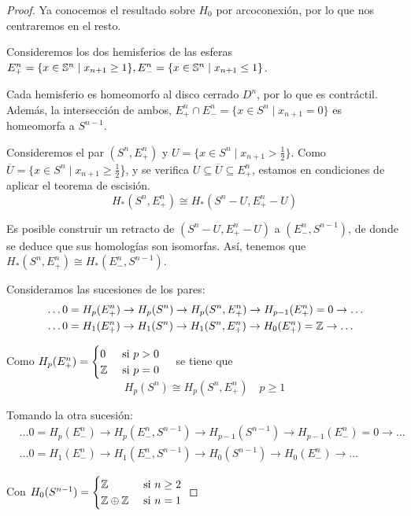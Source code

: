 \begin{proof}
  Ya conocemos el resultado sobre $H_0$ por arcoconexión, por lo que nos centraremos en el resto.

  Consideremos los dos hemisferios de las esferas \\
  $E_+^n = \{x \in \S^n \mid x_{n+1} \geq 1\}, E_-^n = \{x \in \S^n \mid x_{n+1} \leq 1\}$.

  Cada hemisferio es homeomorfo al disco cerrado $D^n$, por lo que es contráctil. Además, la intersección de
  ambos, $E_+^n \cap E_-^n = \{x \in S^n \mid x_{n+1} = 0\}$ es homeomorfa a $S^{n-1}$.

  Consideremos el par $(S^n, E_+^n)$ y $U = \{x \in S^n \mid x_{n+1} > \frac{1}{2}\}$. Como
  $\overline{U} = \{x \in S^n \mid x_{n+1} \geq \frac{1}{2}$\}, y se verifica $U \subseteq \overline{U} \subseteq E_+^n$,
  estamos en condiciones de aplicar el teorema de escisión.
  \[ H_*(S^n, E_+^n) \cong H_*(S^n - U, E_+^n - U) \]

  Es posible construir un retracto de $(S^n - U, E_+^n - U)$ a $(E_-^n, S^{n-1})$, de donde se deduce que sus
  homologías son isomorfas. Así, tenemos que $H_*(S^n, E_+^n) \cong H_*(E_-^n, S^{n-1})$.

  Consideramos las sucesiones de los pares:
  \begin{align*}
    &\dots 0 = H_p(E_+^n) \to H_p(S^n) \to H_p(S^n, E_+^n) \to H_{p-1}(E_+^n) = 0 \to \dots \\
    &\dots 0 = H_1(E_+^n) \to H_1(S^n) \to H_1(S^n, E_+^n) \to H_0(E_+^n) = \Z \to \dots
  \end{align*}

  Como $H_p(E_+^n) = \begin{cases} 0 &\text{ si } p > 0 \\ \Z &\text{ si } p = 0 \end{cases} \quad$ se tiene que
  \[H_p(S^n) \cong H_p(S^n, E_+^n) \quad p \geq 1\]

  Tomando la otra sucesión:
  \begin{align*}
    &\dots 0 = H_p(E_-^n) \to H_p(E_-^n, S^{n-1}) \to H_{p-1}(S^{n-1}) \to H_{p-1}(E_-^n) = 0 \to \dots \\
    &\dots 0 = H_1(E_-^n) \to H_1(E_-^n, S^{n-1}) \to H_0(S^{n-1}) \to H_0(E_-^n) \to \dots
  \end{align*}

  Con $H_0(S^{n-1}) = \begin{cases} \Z &\text{ si } n \geq 2 \\ \Z \oplus \Z &\text{ si } n = 1 \end{cases}$


\end{proof}
